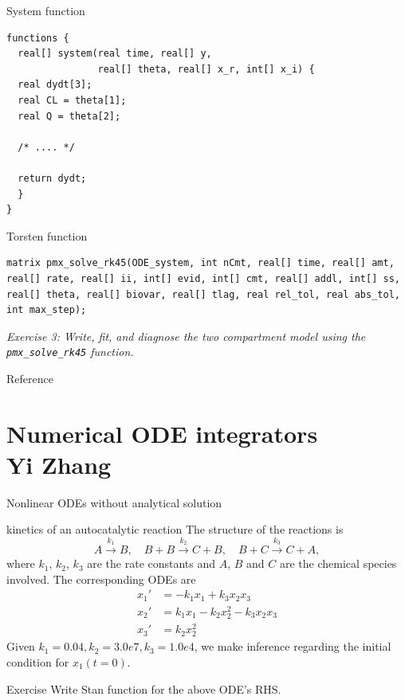 \documentclass[presentation]{beamer}
\begin{document}
\begin{frame}[fragile,label={sec:orgd03efec}]{System function}
 \begin{verbatim}
functions {
  real[] system(real time, real[] y, 
                real[] theta, real[] x_r, int[] x_i) {
  real dydt[3];
  real CL = theta[1];
  real Q = theta[2];

  /* .... */

  return dydt;
  }
}
\end{verbatim}
\end{frame}
\begin{frame}[fragile,label={sec:org94ac163}]{Torsten function}
 \begin{verbatim}
matrix pmx_solve_rk45(ODE_system, int nCmt, real[] time, real[] amt, real[] rate, real[] ii, int[] evid, int[] cmt, real[] addl, int[] ss, real[] theta, real[] biovar, real[] tlag, real rel_tol, real abs_tol, int max_step);
\end{verbatim}
\emph{\textcolor{MRGGreen}{Exercise 3}: Write, fit, and diagnose the two compartment model using the \texttt{pmx\_solve\_rk45} function.}
\end{frame}

\begin{frame}[label={sec:org62c2adb}]{Reference}

\end{frame}

\section{Numerical ODE integrators \\ \footnotesize{Yi Zhang}}
\label{sec:org37cc12f}

\begin{frame}[label={sec:org5ac7e8c}]{Nonlinear ODEs without analytical solution}
\begin{block}{kinetics of an autocatalytic reaction \cite{robertson_numerical_1966}}
The structure of the reactions is 
\begin{equation*}
A \xrightarrow{k_1} B,\quad
B+B \xrightarrow{k_2} C + B,\quad
B+C \xrightarrow{k_3} C + A,
\end{equation*}
where \(k_1\), \(k_2\), \(k_3\) are the rate
constants and \(A\), \(B\) and \(C\) are the chemical species
involved. The corresponding ODEs are
\begin{align*}
x_1' &= -k_1x_1 + k_3x_2x_3\\
x_2' &=  k_1x_1 - k_2x_2^2 - k_3x_2x_3\\
x_3' &=  k_2x_2^2
\end{align*}
Given \(k_1=0.04, k_2=3.0e7, k_3=1.0e4\), we make inference
regarding the initial condition for \(x_1(t=0)\).
\end{block}
\begin{block}{Exercise}
Write Stan function for the above ODE's RHS.
\end{block}
\end{frame}
\end{document}
